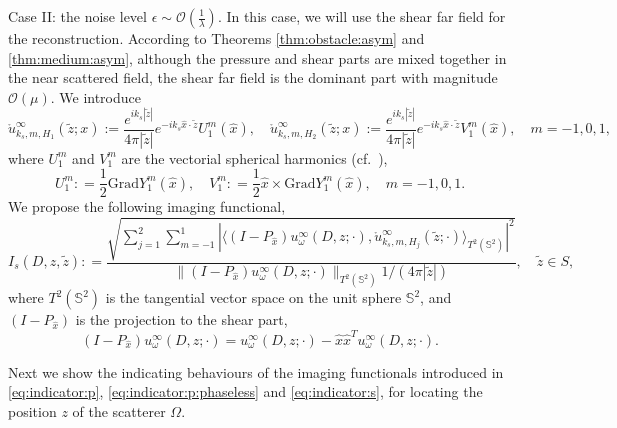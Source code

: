 \documentclass[a4paper,11pt]{article}
\newcommand{\mO}{\mathcal{O}}
\theoremstyle{remark}
\theoremstyle{definition}
\numberwithin{equation}{section}
\begin{document}
Case II: the noise level $ \epsilon \sim \mO(\frac{1}{\lambda})$.
In this case, we will use the shear far field for the reconstruction. According to Theorems \ref{thm:obstacle:asym} and \ref{thm:medium:asym}, although the pressure and shear parts are mixed together in the near scattered field, the shear far field is the dominant part with magnitude $\mO(\mu)$.
We introduce
\[
\mathring{u}_{k_s, m, H_1}^{\infty}(\tilde{z};x) := \frac{e^{ik_s|\tilde{z}|}}{4\pi |\tilde{z}|} e^{-ik_s \hat{x}\cdot \tilde{z}}U_{1}^{m}(\hat{x}),\quad \mathring{u}_{k_s, m, H_2}^{\infty}(\tilde{z};x) := \frac{e^{ik_s|\tilde{z}|}}{4\pi |\tilde{z}|} e^{-ik_s \hat{x}\cdot \tilde{z}}V_{1}^{m}(\hat{x}), \quad m=-1,0,1,
\]
where $U_{1}^m$ and $V_{1}^m$ are the vectorial spherical harmonics (cf.~\cite{CK}),
\[
U_{1}^m: = \frac{1}{2} \text{Grad}Y_{1}^m(\hat{x}), \quad V_{1}^m: = \frac{1}{2} \hat{x} \times \text{Grad}Y_{1}^m(\hat{x}), \quad m=-1,0,1.
\]
We propose the following imaging functional,
\begin{equation}\label{eq:indicator:s}
I_{s}(D,z, \tilde{z}): = \frac{\sqrt{\sum_{j=1}^2\sum_{m=-1}^1|\langle (I-P_{\hat{x}})u_{\omega}^{\infty}(D,z;\cdot), \mathring{u}_{k_s,m, H_j}^{\infty}(\tilde{z};\cdot)\rangle_{T^{2}(\mathbb{S}^2)}|^2}}{\|(I-P_{\hat{x}})u_{\omega}^{\infty}(D,z;\cdot)\|_{T^2(\mathbb{S}^2)} 1/{(4\pi |\tilde{z}|)}}, \quad \tilde{z} \in S,
\end{equation}
where $T^2(\mathbb{S}^2)$ is the tangential vector space on the unit sphere $\mathbb{S}^2$, and $(I-P_{\hat{x}})$ is the projection to the shear part,
\[
(I-P_{\hat{x}})u_{\omega}^{\infty}(D,z;\cdot) =u_{\omega}^{\infty}(D,z;\cdot) - \hat{x} \hat{x}^{T}u_{\omega}^{\infty}(D,z;\cdot).
\]

Next we show the indicating behaviours of the imaging functionals introduced in \eqref{eq:indicator:p}, \eqref{eq:indicator:p:phaseless} and \eqref{eq:indicator:s}, for locating the position $z$ of the scatterer $\Omega$.
\end{document}
